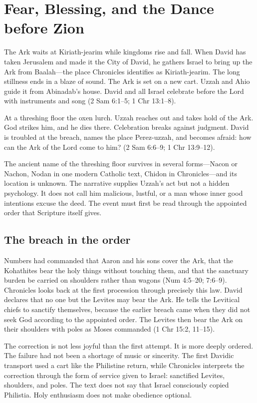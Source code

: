 \section{Fear, Blessing, and the Dance before Zion}

The Ark waits at Kiriath-jearim while kingdoms rise and fall.  When David has
taken Jerusalem and made it the City of David, he gathers Israel to bring up
the Ark from Baalah---the place Chronicles identifies as Kiriath-jearim.  The
long stillness ends in a blaze of sound.  The Ark is set on a new cart.  Uzzah
and Ahio guide it from Abinadab's house.  David and all Israel celebrate before
the Lord with instruments and song (2 Sam 6:1--5; 1 Chr 13:1--8).

At a threshing floor the oxen lurch.  Uzzah reaches out and takes hold of the
Ark.  God strikes him, and he dies there.  Celebration breaks against judgment.
David is troubled at the breach, names the place Perez-uzzah, and becomes
afraid: how can the Ark of the Lord come to him? (2 Sam 6:6--9;
1 Chr 13:9--12).

The ancient name of the threshing floor survives in several forms---Nacon or
Nachon, Nodan in one modern Catholic text, Chidon in Chronicles---and its
location is unknown.  The narrative supplies Uzzah's act but not a hidden
psychology.  It does not call him malicious, lustful, or a man whose inner
good intentions excuse the deed.  The event must first be read through the
appointed order that Scripture itself gives.

\subsection{The breach in the order}

Numbers had commanded that Aaron and his sons cover the Ark, that the
Kohathites bear the holy things without touching them, and that the sanctuary
burden be carried on shoulders rather than wagons (Num 4:5--20; 7:6--9).
Chronicles looks back at the first procession through precisely this law.
David declares that no one but the Levites may bear the Ark.  He tells the
Levitical chiefs to sanctify themselves, because the earlier breach came when
they did not seek God according to the appointed order.  The Levites then bear
the Ark on their shoulders with poles as Moses commanded
(1 Chr 15:2, 11--15).

The correction is not less joyful than the first attempt.  It is more deeply
ordered.  The failure had not been a shortage of music or sincerity.  The
first Davidic transport used a cart like the Philistine return, while
Chronicles interprets the correction through the form of service given to
Israel: sanctified Levites, shoulders, and poles.  The text does not say that
Israel consciously copied Philistia.  Holy enthusiasm does not make obedience
optional.

